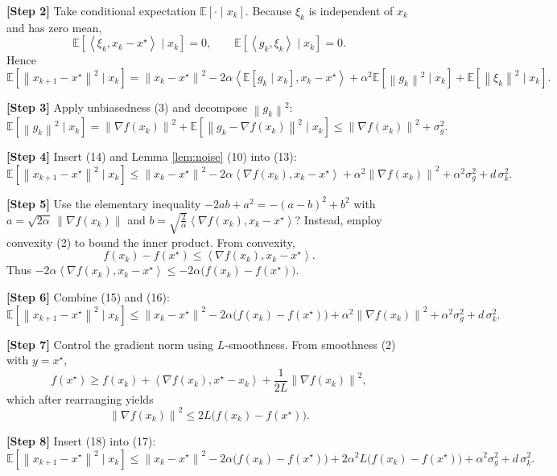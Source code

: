\documentclass[11pt]{article}
\newcommand{\E}{\mathbb{E}}
\newcommand{\norm}[1]{\left\|#1\right\|}
\newcommand{\iprod}[2]{\left\langle #1,#2\right\rangle}
\begin{document}
\noindent\textbf{[Step 2] }Take conditional expectation $\E[\cdot\mid x_{k}]$.
Because $\xi_{k}$ is independent of $x_{k}$ and has zero mean,
\[
\E\!\left[\iprod{\xi_{k}}{x_{k}-x^{\star}}\mid x_{k}\right]=0,\qquad
\E\!\left[\iprod{g_{k}}{\xi_{k}}\mid x_{k}\right]=0.
\tag{12}
\]
Hence
\[
\E\!\left[\norm{x_{k+1}-x^{\star}}^{2}\mid x_{k}\right]
= \norm{x_{k}-x^{\star}}^{2}
-2\alpha\iprod{\E[g_{k}\mid x_{k}]}{x_{k}-x^{\star}}
+\alpha^{2}\E\!\left[\norm{g_{k}}^{2}\mid x_{k}\right]
+\E\!\left[\norm{\xi_{k}}^{2}\mid x_{k}\right].
\tag{13}
\]

\noindent\textbf{[Step 3] }Apply unbiasedness (3) and decompose $\norm{g_{k}}^{2}$:
\[
\E\!\left[\norm{g_{k}}^{2}\mid x_{k}\right]
= \norm{\nabla f(x_{k})}^{2}
+ \E\!\left[\norm{g_{k}-\nabla f(x_{k})}^{2}\mid x_{k}\right]
\le \norm{\nabla f(x_{k})}^{2}+ \sigma_{g}^{2}.
\tag{14}
\]

\noindent\textbf{[Step 4] }Insert (14) and Lemma \ref{lem:noise} (10) into (13):
\[
\E\!\left[\norm{x_{k+1}-x^{\star}}^{2}\mid x_{k}\right]
\le \norm{x_{k}-x^{\star}}^{2}
-2\alpha\iprod{\nabla f(x_{k})}{x_{k}-x^{\star}}
+\alpha^{2}\norm{\nabla f(x_{k})}^{2}
+\alpha^{2}\sigma_{g}^{2}
+d\,\sigma_{k}^{2}.
\tag{15}
\]

\noindent\textbf{[Step 5] }Use the elementary inequality $-2ab+a^{2}=-(a-b)^{2}+b^{2}$ with $a=\sqrt{2\alpha}\,\norm{\nabla f(x_{k})}$ and $b=\sqrt{\frac{2}{\alpha}}\iprod{\nabla f(x_{k})}{x_{k}-x^{\star}}$?  Instead, employ convexity (2) to bound the inner product.  
From convexity,
\[
f(x_{k})-f(x^{\star})\le \iprod{\nabla f(x_{k})}{x_{k}-x^{\star}}.
\tag{16}
\]
Thus $-2\alpha\iprod{\nabla f(x_{k})}{x_{k}-x^{\star}}\le -2\alpha\big(f(x_{k})-f(x^{\star})\big)$.

\noindent\textbf{[Step 6] }Combine (15) and (16):
\[
\E\!\left[\norm{x_{k+1}-x^{\star}}^{2}\mid x_{k}\right]
\le \norm{x_{k}-x^{\star}}^{2}
-2\alpha\big(f(x_{k})-f(x^{\star})\big)
+\alpha^{2}\norm{\nabla f(x_{k})}^{2}
+\alpha^{2}\sigma_{g}^{2}
+d\,\sigma_{k}^{2}.
\tag{17}
\]

\noindent\textbf{[Step 7] }Control the gradient norm using $L$‑smoothness.  
From smoothness (2) with $y=x^{\star}$,
\[
f(x^{\star})\ge f(x_{k})+\iprod{\nabla f(x_{k})}{x^{\star}-x_{k}}
+\frac{1}{2L}\norm{\nabla f(x_{k})}^{2},
\]
which after rearranging yields
\[
\norm{\nabla f(x_{k})}^{2}\le 2L\big(f(x_{k})-f(x^{\star})\big).
\tag{18}
\]

\noindent\textbf{[Step 8] }Insert (18) into (17):
\[
\E\!\left[\norm{x_{k+1}-x^{\star}}^{2}\mid x_{k}\right]
\le \norm{x_{k}-x^{\star}}^{2}
-2\alpha\big(f(x_{k})-f(x^{\star})\big)
+2\alpha^{2}L\big(f(x_{k})-f(x^{\star})\big)
+\alpha^{2}\sigma_{g}^{2}
+d\,\sigma_{k}^{2}.
\tag{19}
\]
\end{document}
